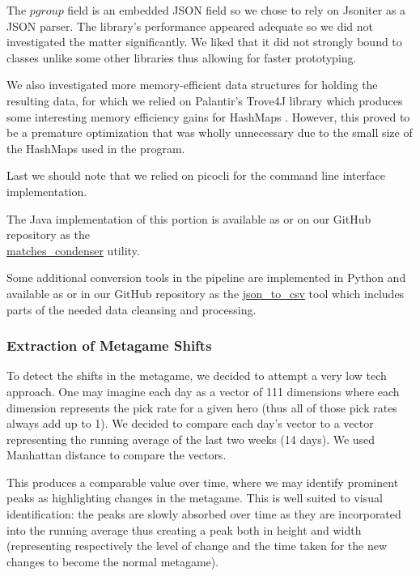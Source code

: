 The $pgroup$ field is an embedded JSON field so we chose to rely on Jsoniter \cite{wenJsoniterJsoniterator2019} as a JSON parser. The library's performance appeared adequate so we did not investigated the matter significantly. We liked that it did not strongly bound to classes unlike some other libraries thus allowing for faster prototyping.

We also investigated more memory-efficient data structures for holding the resulting data, for which we relied on Palantir's Trove4J library which produces some interesting memory efficiency gains for HashMaps \cite{vorontsovTroveLibraryUsing2014}. However, this proved to be a premature optimization that was wholly unnecessary due to the small size of the HashMaps used in the program.

Last we should note that we relied on picocli \cite{popmaPicocli2019} for the command line interface implementation.

The Java implementation of this portion is available as  or on our GitHub repository as the \\\href{https://github.com/marcolussetti/opendotadump-tools/tree/master/matches_condenser}{matches\_condenser} utility.

Some additional conversion tools in the pipeline are implemented in Python and available as  or in our GitHub repository as the \href{https://github.com/marcolussetti/opendotadump-tools/tree/master/json_to_csv}{json\_to\_csv} tool which includes parts of the needed data cleansing and processing.

\subsubsection{Extraction of Metagame Shifts} %

To detect the shifts in the metagame, we decided to attempt a very low tech approach. One may imagine each day as a vector of 111 dimensions where each dimension represents the pick rate for a given hero (thus all of those pick rates always add up to 1). We decided to compare each day's vector to a vector representing the running average of the last two weeks (14 days). We used Manhattan distance to compare the vectors.

This produces a comparable value over time, where we may identify prominent peaks as highlighting changes in the metagame. This is well suited to visual identification: the peaks are slowly absorbed over time as they are incorporated into the running average thus creating a peak both in height and width (representing respectively the level of change and the time taken for the new changes to become the normal metagame).

